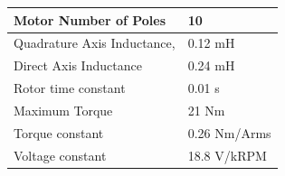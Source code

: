 \begin{table}[h]
\begin{tabular}{l l}
			Motor Number of Poles              & 10             \\ \hline
			Quadrature Axis Inductance,        & 0.12 mH        \\ \hline
			Direct Axis Inductance             & 0.24 mH        \\ \hline
			Rotor time constant                & 0.01 s         \\ \hline
			Maximum Torque                     & 21 Nm          \\ \hline
			Torque constant                    & 0.26 Nm/Arms   \\ \hline
			Voltage constant                   & 18.8 V/kRPM    \\ \bottomrule
		\end{tabular}
\end{table}

